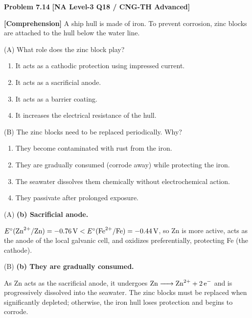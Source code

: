 \begin{problembox}
\textbf{Problem 7.14} \hfill \textbf{[NA Level-3 Q18 / CNG-TH Advanced]}

\textbf{[Comprehension]} A ship hull is made of iron. To prevent corrosion, zinc blocks are attached to the hull below the water line.

(A) What role does the zinc block play?
\begin{enumerate}[label=(\alph*)]
    \item It acts as a cathodic protection using impressed current.
    \item It acts as a sacrificial anode.
    \item It acts as a barrier coating.
    \item It increases the electrical resistance of the hull.
\end{enumerate}

(B) The zinc blocks need to be replaced periodically. Why?
\begin{enumerate}[label=(\alph*)]
    \item They become contaminated with rust from the iron.
    \item They are gradually consumed (corrode away) while protecting the iron.
    \item The seawater dissolves them chemically without electrochemical action.
    \item They passivate after prolonged exposure.
\end{enumerate}
\end{problembox}
\begin{solution}
(A) \textbf{(b) Sacrificial anode.}

$E^\circ(\ce{Zn^2+/Zn}) = -0.76\,\text{V} < E^\circ(\ce{Fe^2+/Fe}) = -0.44\,\text{V}$, so Zn is more active, acts as the anode of the local galvanic cell, and oxidizes preferentially, protecting Fe (the cathode).

(B) \textbf{(b) They are gradually consumed.}

As Zn acts as the sacrificial anode, it undergoes $\ce{Zn -> Zn^2+ + 2e-}$ and is progressively dissolved into the seawater. The zinc blocks must be replaced when significantly depleted; otherwise, the iron hull loses protection and begins to corrode.
\end{solution}
